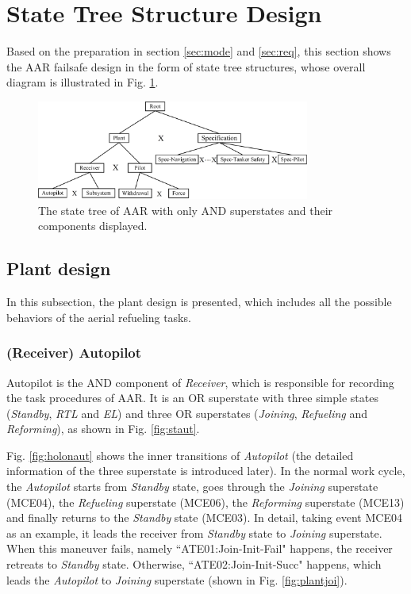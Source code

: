 \section{State Tree Structure Design}
Based on the preparation in section \ref{sec:mode} and \ref{sec:req}, this section shows the AAR failsafe design in the form of state tree structures, whose overall diagram is illustrated in Fig. \ref{fig:root}. 

\begin{figure}[h]
	\begin{center}
		\includegraphics[width=0.8\textwidth]{Figures/Figs_Ch14/Fig10_SAAR}
		\par\end{center}
	\caption{The state tree of AAR with only AND superstates and their components displayed.}
	\label{fig:root} 
\end{figure}

\subsection{Plant design}
In this subsection, the plant design is presented, which includes all the possible behaviors of the aerial refueling tasks. 
\subsubsection{(Receiver) Autopilot}
Autopilot is the AND component of \textit{Receiver}, which is responsible for recording the task procedures of AAR. It is an OR superstate with three simple states (\textit{Standby}, \textit{RTL} and \textit{EL}) and three OR superstates (\textit{Joining}, \textit{Refueling} and \textit{Reforming}), as shown in Fig. \ref{fig:staut}.   

Fig. \ref{fig:holonaut} shows the inner transitions of \textit{Autopilot} (the detailed information of the three superstate is introduced later). In the normal work cycle, the \textit{Autopilot} starts from \textit{Standby} state, goes through the \textit{Joining} superstate  (MCE04), the \textit{Refueling} superstate (MCE06), the \textit{Reforming} superstate (MCE13) and finally returns to the \textit{Standby} state (MCE03). In detail, taking event MCE04 as an example, it leads the receiver from \textit{Standby} state to \textit{Joining} superstate. When this maneuver fails, namely ``ATE01:Join-Init-Fail" happens, the receiver retreats to \textit{Standby} state. Otherwise, ``ATE02:Join-Init-Succ" happens, which leads the \textit{Autopilot} to \textit{Joining} superstate (shown in Fig. \ref{fig:plantjoi}).

